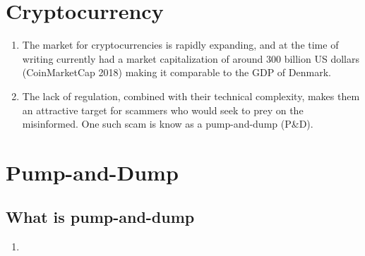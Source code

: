 \section{Cryptocurrency}
\begin{enumerate}
    \item The market for cryptocurrencies is rapidly expanding, and at the time of writing currently had a market capitalization of around 300 billion US dollars (CoinMarketCap 2018) making it comparable to the GDP of Denmark.
    \item The lack of regulation, combined with their technical complexity, makes them an attractive target for scammers who would seek to prey on the misinformed. One such scam is know as a pump-and-dump (P\&D).
\end{enumerate}


\section{Pump-and-Dump}
\subsection{What is pump-and-dump}
\begin{enumerate}
    \item 
\end{enumerate}

